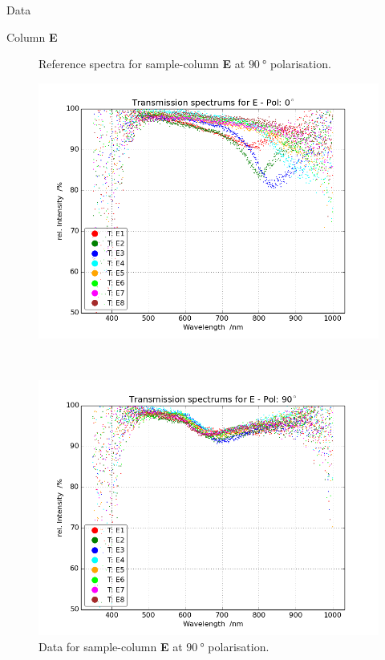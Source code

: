 \begin{appendix}
\begin{chapter}{Data}
\begin{section}{Column \textbf{E}}
\begin{figure}[ht!]
\begin{minipage}{.92\textwidth}
          \caption{Reference spectra for sample-column \textbf{E} at
              $\SI{90}{\degree}$ polarisation.}
          \label{fig:Refspec_EPol90}
        \end{minipage}
      \end{figure}
      \newpage
      \begin{figure}[ht!]
        \centering
        \begin{minipage}{.92\textwidth}
          \centering
          \includegraphics[width=\textwidth]{Figures/TransspecRAW_EPol0.png}
          \caption{Data for sample-column \textbf{E} at $\SI{0}{\degree}$
              polarisation.}
          \label{fig:TransspecRAW_EPol0}
        \end{minipage}\\
        \begin{minipage}{.92\textwidth}
          \centering
          \includegraphics[width=\textwidth]{Figures/TransspecRAW_EPol90.png}
          \caption{Data for sample-column \textbf{E} at $\SI{90}{\degree}$
              polarisation.}
          \label{fig:TransspecRAW_EPol90}
        \end{minipage}
      \end{figure}
      

\end{section}
\end{chapter}
\end{appendix}
